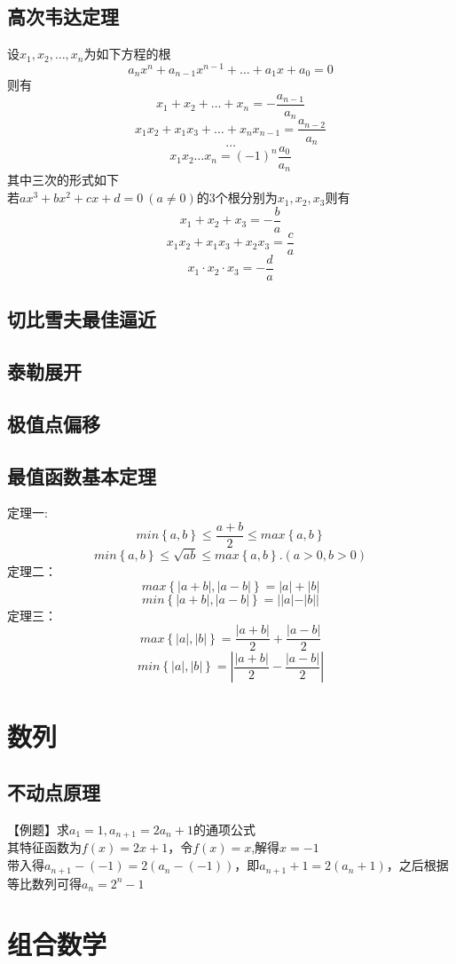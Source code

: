 \documentclass[UTF8]{ctexart}
\begin{document}
		\subsection{高次韦达定理}
			设$x_1,x_2,\dots,x_n$为如下方程的根
			\[a_n x^n+a_{n-1} x^{n-1}+\dots+a_1 x+a_0=0\]
			则有
			\[x_1+x_2+\dots+x_n=-\frac{a_{n-1}}{a_n}\]
			\[x_1 x_2+x_1 x_3+\dots+x_n x_{n-1}=\frac{a_{n-2}}{a_n}\]
			\[\dots\]
			\[x_1 x_2\dots x_n=(-1)^n \frac{a_0}{a_n}\]
			其中三次的形式如下\\
			若$ax^3+bx^2+cx+d=0\ (a\neq 0)$的3个根分别为$x_1,x_2,x_3$则有
			\[x_1+x_2+x_3=-\frac{b}{a}\]
			\[x_1 x_2+x_1 x_3+x_2 x_3=\frac{c}{a}\]
			\[x_1\cdot x_2\cdot x_3=-\frac{d}{a}\]		
		\subsection{切比雪夫最佳逼近}
		\subsection{泰勒展开}
		\subsection{极值点偏移}
		\subsection{最值函数基本定理}
			定理一:
			\[min\left\{a,b\right\}\leq\frac{a+b}{2}\leq max\left\{a,b\right\}\]
			\[min\left\{a,b\right\}\leq\sqrt{ab}\leq max\left\{a,b\right\}.(a>0,b>0)\]
			\indent 定理二：
			\[max\left\{\left|a+b\right|,\left|a-b\right| \right\}=|a|+|b|\]
			\[min\left\{\left|a+b\right|,\left|a-b\right| \right\}=||a|-|b||\]
			\indent 定理三：
			\[max\left\{|a|,|b|\right\}=\frac{|a+b|}{2}+\frac{|a-b|}{2}\]
			\[min\left\{|a|,|b|\right\}=\left|\frac{|a+b|}{2}-\frac{|a-b|}{2}\right|\]
	\section{数列}
		\subsection{不动点原理}
			【例题】求$a_1 = 1 , a_{n+1}=2a_n +1$的通项公式\\
			其特征函数为$f(x)=2x+1$，令$f(x)=x$,解得$x=-1$\\
			带入得$a_{n+1}-(-1)=2(a_n-(-1))$，即$a_{n+1}+1=2(a_n+1)$，之后根据等比数列可得$a_n=2^n -1$
	\section{组合数学}
\end{document}
